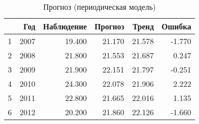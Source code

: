 \begin{table}[ht]
\centering
\begin{tabular}{rrrrrr}
  \hline
 & Год & Наблюдение & Прогноз & Тренд & Ошибка \\ 
  \hline
1 & 2007 & 19.400 & 21.170 & 21.578 & -1.770 \\ 
  2 & 2008 & 21.800 & 21.553 & 21.687 & 0.247 \\ 
  3 & 2009 & 21.900 & 22.151 & 21.797 & -0.251 \\ 
  4 & 2010 & 24.300 & 22.078 & 21.906 & 2.222 \\ 
  5 & 2011 & 22.800 & 21.665 & 22.016 & 1.135 \\ 
  6 & 2012 & 20.200 & 21.860 & 22.126 & -1.660 \\ 
   \hline
\end{tabular}
\caption{Прогноз (периодическая модель)} 
\label{table:auto-class-18-prediction}
\end{table}
